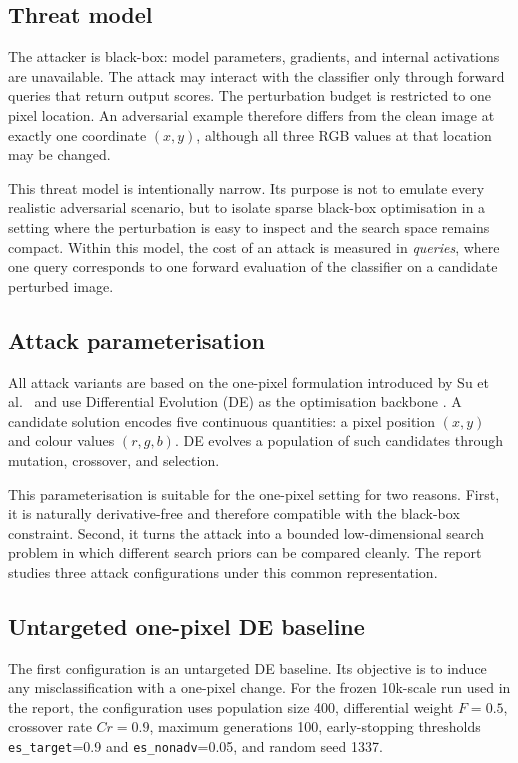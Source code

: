 \subsection{Threat model}
The attacker is black-box: model parameters, gradients, and internal activations are unavailable.
The attack may interact with the classifier only through forward queries that return output scores.
The perturbation budget is restricted to one pixel location.
An adversarial example therefore differs from the clean image at exactly one coordinate $(x,y)$, although all three RGB values at that location may be changed.

This threat model is intentionally narrow.
Its purpose is not to emulate every realistic adversarial scenario, but to isolate sparse black-box optimisation in a setting where the perturbation is easy to inspect and the search space remains compact.
Within this model, the cost of an attack is measured in \emph{queries}, where one query corresponds to one forward evaluation of the classifier on a candidate perturbed image.

\subsection{Attack parameterisation}
All attack variants are based on the one-pixel formulation introduced by Su et al.\ \cite{su2019onepixel} and use Differential Evolution (DE) as the optimisation backbone \cite{storn1997de}.
A candidate solution encodes five continuous quantities: a pixel position $(x,y)$ and colour values $(r,g,b)$.
DE evolves a population of such candidates through mutation, crossover, and selection.

This parameterisation is suitable for the one-pixel setting for two reasons.
First, it is naturally derivative-free and therefore compatible with the black-box constraint.
Second, it turns the attack into a bounded low-dimensional search problem in which different search priors can be compared cleanly.
The report studies three attack configurations under this common representation.

\subsection{Untargeted one-pixel DE baseline}
The first configuration is an untargeted DE baseline.
Its objective is to induce any misclassification with a one-pixel change.
For the frozen 10k-scale run used in the report, the configuration uses population size 400, differential weight $F=0.5$, crossover rate $Cr=0.9$, maximum generations 100, early-stopping thresholds \texttt{es\_target}=0.9 and \texttt{es\_nonadv}=0.05, and random seed 1337.

